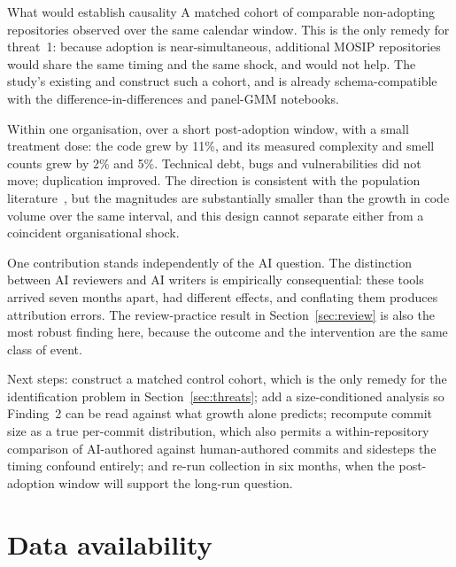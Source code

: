\documentclass[11pt,a4paper]{article}
\begin{document}
\begin{goodbox}{What would establish causality}
A matched cohort of comparable non-adopting repositories observed over the same
calendar window. This is the only remedy for threat~1: because adoption is
near-simultaneous, additional MOSIP repositories would share the same timing
and the same shock, and would not help. The study's existing
 and  construct such
a cohort, and  is already schema-compatible with
the difference-in-differences and panel-GMM notebooks.
\end{goodbox}

\label{sec:conclusion}

Within one organisation, over a short post-adoption window, with a small
treatment dose: the code grew by 11\%, and its measured complexity and smell
counts grew by 2\% and 5\%. Technical debt, bugs and vulnerabilities did not
move; duplication improved. The direction is consistent with the population
literature~\cite{he2026speed}, but the magnitudes are substantially smaller
than the growth in code volume over the same interval, and this design cannot
separate either from a coincident organisational shock.

One contribution stands independently of the AI question. The distinction
between AI reviewers and AI writers is empirically consequential: these tools
arrived seven months apart, had different effects, and conflating them produces
attribution errors. The review-practice result in Section~\ref{sec:review} is
also the most robust finding here, because the outcome and the intervention are
the same class of event.

Next steps: construct a matched control cohort, which is the only remedy for
the identification problem in Section~\ref{sec:threats}; add a size-conditioned
analysis so Finding~2 can be read against what growth alone predicts; recompute
commit size as a true per-commit distribution, which also permits a
within-repository comparison of AI-authored against human-authored commits and
sidesteps the timing confound entirely; and re-run collection in six months,
when the post-adoption window will support the long-run question.

\section*{Data availability}
\end{document}
